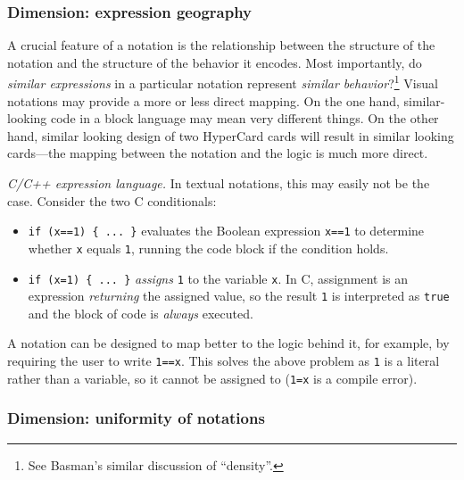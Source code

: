 \documentclass[english,submission]{programming}
\begin{document}
\hypertarget{dimension-expression-geography}{%
\subsubsection{Dimension: expression
geography}\label{dimension-expression-geography}}

A crucial feature of a notation is the relationship between the
structure of the notation and the structure of the behavior it encodes.
Most importantly, do \emph{similar expressions} in a particular notation
represent \emph{similar behavior}?\footnote{See Basman's
  \cite{NotYetCraft} similar discussion of ``density''.} Visual
notations may provide a more or less direct mapping. On the one hand,
similar-looking code in a block language may mean very different things.
On the other hand, similar looking design of two HyperCard cards will
result in similar looking cards---the mapping between the notation and
the logic is much more direct.

\emph{C/C++ expression language.} In textual notations, this may easily
not be the case. Consider the two C conditionals:

\begin{itemize}
\tightlist
\item
  \texttt{if\ (x==1)\ \{\ ...\ \}} evaluates the Boolean expression
  \texttt{x==1} to determine whether \texttt{x} equals \texttt{1},
  running the code block if the condition holds.
\item
  \texttt{if\ (x=1)\ \{\ ...\ \}} \emph{assigns} \texttt{1} to the
  variable \texttt{x}. In C, assignment is an expression
  \emph{returning} the assigned value, so the result \texttt{1} is
  interpreted as \texttt{true} and the block of code is \emph{always}
  executed.
\end{itemize}

A notation can be designed to map better to the logic behind it, for
example, by requiring the user to write \texttt{1==x}. This solves the
above problem as \texttt{1} is a literal rather than a variable, so it
cannot be assigned to (\texttt{1=x} is a compile error).

\hypertarget{dimension-uniformity-of-notations}{%
\subsubsection{Dimension: uniformity of
notations}\label{dimension-uniformity-of-notations}}
\end{document}
